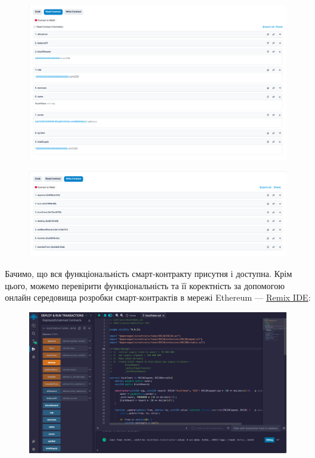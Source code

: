     \begin{figure}[ht!]
        \centering
        \includegraphics[scale=0.345]{IMAGES/etherscan-reading.png}
        \label{fig_vsc}
    \end{figure}

    \begin{figure}[ht!]
        \centering
        \includegraphics[scale=0.345]{IMAGES/etherscan-writing.png}
        \label{fig_vsc}
    \end{figure}

\newpage
Бачимо, що вся функціональність смарт-контракту присутня і доступна.
Крім цього, можемо перевірити функціональність та її коректність за допомогою онлайн середовища розробки смарт-контрактів в мережі Ethereum --- \href{https://remix.ethereum.org/}{Remix IDE}:

    \begin{figure}[ht]
        \centering
        \includegraphics[scale=0.3]{IMAGES/remixIDE.png}
        \label{fig_vsc}
    \end{figure}

